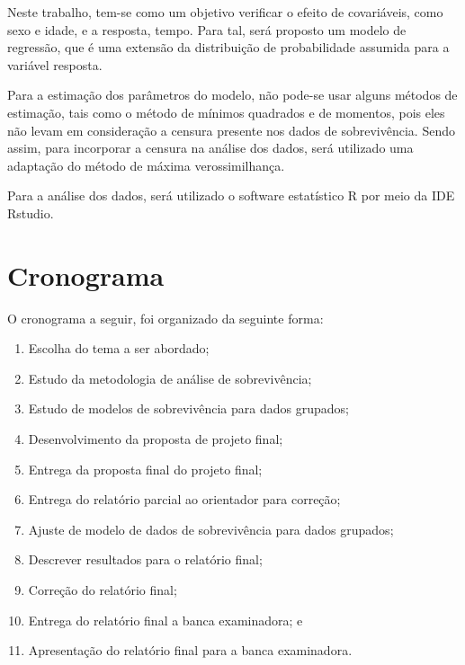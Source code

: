 Neste trabalho, tem-se como um objetivo verificar o efeito de covariáveis, como sexo e idade, e a resposta, tempo. Para tal, será proposto um modelo de regressão, que é uma extensão da distribuição de probabilidade assumida para a variável resposta.

Para a estimação dos parâmetros do modelo, não pode-se usar alguns métodos de estimação, tais como o método de mínimos quadrados e de momentos, pois eles não levam em consideração a censura presente nos dados de sobrevivência. Sendo assim, para incorporar a censura na análise dos dados, será utilizado uma adaptação do método de máxima verossimilhança.

Para a análise dos dados, será utilizado o software estatístico R por meio da IDE Rstudio.

\section*{Cronograma}

O cronograma a seguir, foi organizado da seguinte forma:

\begin{enumerate}
	\item Escolha do tema a ser abordado;
	\item Estudo da metodologia de análise de sobrevivência;
	\item Estudo de modelos de sobrevivência para dados grupados;
	\item Desenvolvimento da proposta de projeto final;	
	\item Entrega da proposta final do projeto final;
	\item Entrega do relatório parcial ao orientador para correção;
	\item Ajuste de modelo de dados de sobrevivência para dados grupados;
	\item Descrever resultados para o relatório final;
	\item Correção do relatório final;
	\item Entrega do relatório final a banca examinadora; e
	\item Apresentação do relatório final para a banca examinadora.
\end{enumerate}
		
